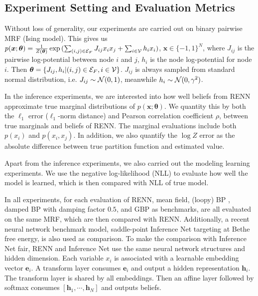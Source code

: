 \subsection{Experiment Setting and Evaluation Metrics}
\label{subsec:exp-setting}
Without loss of generality, our experiments are carried out on binary pairwise MRF (Ising model). This gives us $p(\bm{x}; \bm{\theta}) = \frac{1}{Z(\bm{\theta})}\exp{(\sum_{(i,j)\in \mathcal{E}_F} J_{ij} x_i x_j + \sum_{i\in \mathcal{V}}h_i x_i)}$, $\bm{x} \in \{-1, 1\}^{N}$, where $J_{ij}$ is the pairwise log-potential between node $i$ and $j$, $h_i$ is the node log-potential for node $i$. Then $\bm{\theta} = \left\{ J_{ij}, h_i| (i,j) \in \mathcal{E}_F, i \in \mathcal{V} \right\}$. $J_{ij}$ is always sampled from standard normal distribution, i.e. $J_{ij}\sim \mathcal{N}(0,1)$, meanwhile $h_i \sim \mathcal{N}(0, \gamma^{2})$.

In the inference experiments, we are interested into how well beliefs from RENN approximate true marginal distributions of $p(\bm{x};\bm{\theta})$. We quantity this by both the $\ell_1$ error ($\ell_1$-norm distance) and Pearson correlation coefficient $\rho$, between true marginals and beliefs of RENN. The marginal evaluations include both $p(x_i)$ and $p(x_i,x_j)$. In addition, we also quantify the $\log{Z}$ error as the absolute difference between true partition function and estimated value.

Apart from the inference experiments, we also carried out the modeling learning experiments. We use the negative log-likelihood (NLL) to evaluate how well the model is learned, which is then compared with NLL of true model.

In all experiments, for each evaluation of RENN, mean field, (loopy) BP \cite{mooij2007sufficient}, damped BP \cite{Pretti2005damping} with damping factor $0.5$, and GBP \cite{yedida2005constucting} as benchmarks, are all evaluated on the same MRF, which are then compared with RENN. Additionally, a recent neural network benchmark model, saddle-point Inference Net \cite{NIPS2019_9687} targeting at Bethe free energy, is also used as comparison. To make the comparison with Inference Net fair, RENN and Inference Net use the same neural network structures and hidden dimension. Each variable $x_i$ is associated with a learnable embedding vector $\bm{e}_i$. A transform layer \cite{AshishNIPS2017_7181} consumes $\bm{e}_i$ and output a hidden representation $\bm{h}_i$. The transform layer is shared by all embeddings. Then an affine layer followed by softmax consumes $[\bm{h}_1, \cdots, \bm{h}_N]$ and outputs beliefs.

